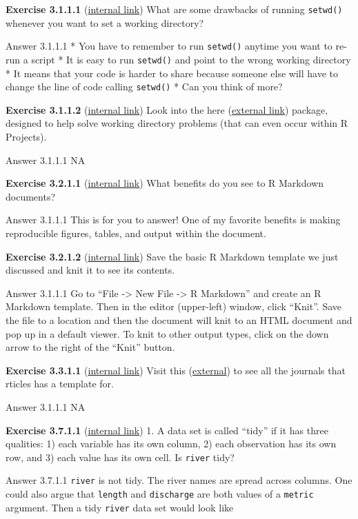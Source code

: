 \documentclass[
]{book}
\begin{document}
\textbf{Exercise 3.1.1.1} (\protect\hyperlink{ex-set11}{internal link})
What are some drawbacks of running \texttt{setwd()} whenever you want to set a working directory?

Answer 3.1.1.1
* You have to remember to run \texttt{setwd()} anytime you want to re-run a script
* It is easy to run \texttt{setwd()} and point to the wrong working directory
* It means that your code is harder to share because someone else will have to change the line of code calling \texttt{setwd()}
* Can you think of more?

\textbf{Exercise 3.1.1.2} (\protect\hyperlink{ex-set11}{internal link})
Look into the here (\href{https://here.r-lib.org/}{external link}) package, designed to help solve working directory problems (that can even occur within R Projects).

Answer 3.1.1.1
NA

\textbf{Exercise 3.2.1.1} (\protect\hyperlink{ex-set12}{internal link})
What benefits do you see to R Markdown documents?

Answer 3.1.1.1
This is for you to answer! One of my favorite benefits is making reproducible figures, tables, and output within the document.

\textbf{Exercise 3.2.1.2} (\protect\hyperlink{ex-set12}{internal link})
Save the basic R Markdown template we just discussed and knit it to see its contents.

Answer 3.1.1.1
Go to ``File -\textgreater{} New File -\textgreater{} R Markdown'' and create an R Markdown template. Then in the editor (upper-left) window, click ``Knit''. Save the file to a location and then the document will knit to an HTML document and pop up in a default viewer. To knit to other output types, click on the down arrow to the right of the ``Knit'' button.

\textbf{Exercise 3.3.1.1} (\protect\hyperlink{ex-set13}{internal link})
Visit this (\href{https://github.com/rstudio/rticles}{external}) to see all the journals that rticles has a template for.

Answer 3.1.1.1
NA

\textbf{Exercise 3.7.1.1} (\protect\hyperlink{ex-set14}{internal link})
1. A data set is called ``tidy'' if it has three qualities: 1) each variable has its own column, 2) each observation has its own row, and 3) each value has its own cell. Is \texttt{river} tidy?

Answer 3.7.1.1
\texttt{river} is not tidy. The river names are spread across columns. One could also argue that \texttt{length} and \texttt{discharge} are both values of a \texttt{metric} argument. Then a tidy \texttt{river} data set would look like
\end{document}
